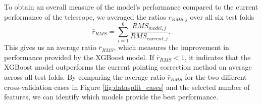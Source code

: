 To obtain an overall measure of the model's performance compared to the current performance of the telescope, we averaged the ratios $r_{RMS,j}$ over all six test folds
\begin{equation}
    \bar{r}_{RMS} = \sum_{i=1}^6 \frac{RMS_{model,j}}{RMS_{current,j}}.
\end{equation}
This gives us an average ratio $\bar{r}_{RMS}$, which measures the improvement in performance provided by the XGBoost model.
If $\bar{r}_{RMS} < 1$, it indicates that the XGBoost model outperforms the current pointing correction method on average across all test folds.
By comparing the average ratio $\bar{r}_{RMS}$ for the two different cross-validation cases in Figure \ref{fig:datasplit_cases} and the selected number of features,
we can identify which models provide the best performance.
